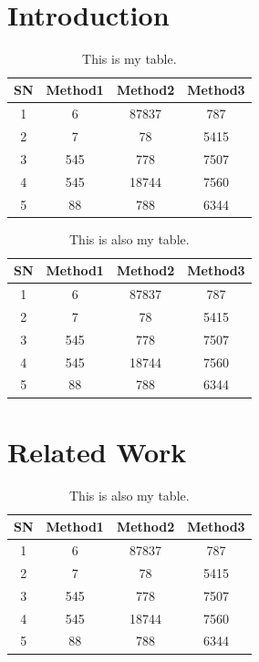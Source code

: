 \myemptypage
\begin{center}
{\huge\textbf{\ttitle}}\\
\end{center}
\section{Introduction}
\begin{table}[h!]
\centering
 \begin{tabular}{c c c c} 
 \hline
 SN & Method1 & Method2 & Method3 \\ [0.5ex] 
 \hline
 1 & 6 & 87837 & 787 \\ 
 2 & 7 & 78 & 5415 \\
 3 & 545 & 778 & 7507 \\
 4 & 545 & 18744 & 7560 \\
 5 & 88 & 788 & 6344 \\ [1ex] 
 \hline
 \end{tabular}
 \caption{\label{tab:mytab1} This is my table.}
\end{table}


\begin{table}[h!]
\centering
 \begin{tabular}{c c c c} 
 \hline
 SN & Method1 & Method2 & Method3 \\ [0.5ex] 
 \hline
 1 & 6 & 87837 & 787 \\ 
 2 & 7 & 78 & 5415 \\
 3 & 545 & 778 & 7507 \\
 4 & 545 & 18744 & 7560 \\
 5 & 88 & 788 & 6344 \\ [1ex] 
 \hline
 \end{tabular}
 \caption{\label{tab:mytab2} This is also my table.}
\end{table}


\clearpage
\section{Related Work}
\begin{table}[h!]
\centering
 \begin{tabular}{c c c c} 
 \hline
 SN & Method1 & Method2 & Method3 \\ [0.5ex] 
 \hline
 1 & 6 & 87837 & 787 \\ 
 2 & 7 & 78 & 5415 \\
 3 & 545 & 778 & 7507 \\
 4 & 545 & 18744 & 7560 \\
 5 & 88 & 788 & 6344 \\ [1ex] 
 \hline
 \end{tabular}
 \caption{\label{tab:mytab3} This is also my table.}
\end{table}\clearpage

